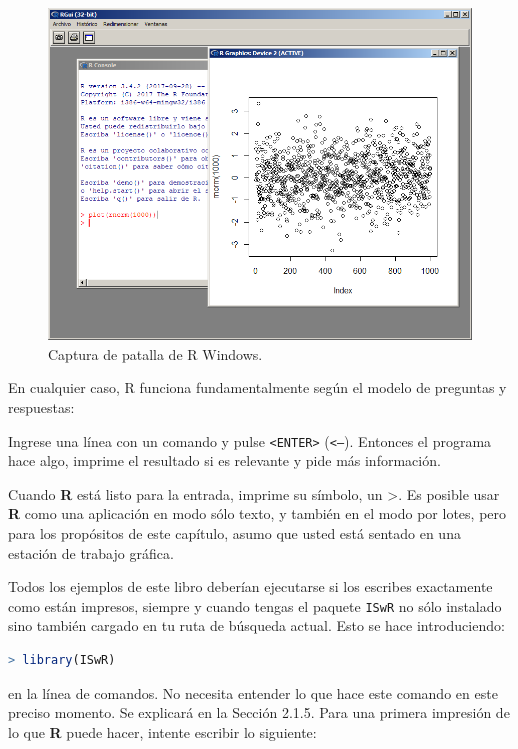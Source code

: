 \begin{figure}[H]
  \includegraphics[width=\linewidth]{fig-1.png}
  \caption{Captura de patalla de R Windows.}
  \label{fig:fig-1}
\end{figure}

En cualquier caso, R funciona fundamentalmente según el modelo de
preguntas y respuestas:

Ingrese una línea con un comando y pulse \texttt{<ENTER>} (\texttt{<--}).
Entonces el programa hace algo, imprime el resultado si es relevante y pide más
información.

Cuando \textbf{R} está listo para la entrada, imprime su símbolo, un
\textquotedbl{}>\textquotedbl{}.  Es posible usar \textbf{R} como una
aplicación en modo sólo texto, y también en el modo por lotes, pero para los
propósitos de este capítulo, asumo que usted está sentado en una estación de
trabajo gráfica.

Todos los ejemplos de este libro deberían ejecutarse si los escribes
exactamente como están impresos, siempre y cuando tengas el paquete
\texttt{ISwR} no sólo instalado sino también cargado en tu ruta de búsqueda
actual. Esto se hace introduciendo:


\begin{lstlisting}[language=R]
> library(ISwR)
\end{lstlisting}

en la línea de comandos. No necesita entender lo que hace este comando en este
preciso momento. Se explicará en la Sección 2.1.5. Para una primera impresión de
lo que \textbf{R} puede hacer, intente escribir lo siguiente:

